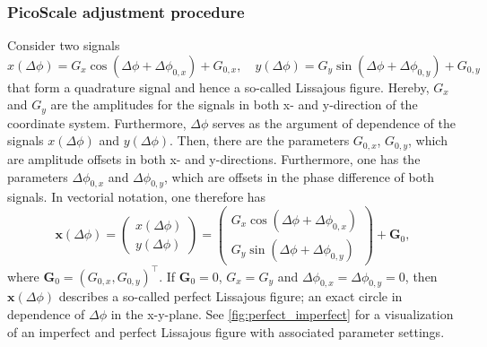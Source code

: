 \documentclass{report}
\numberwithin{tm}{section}
\begin{document}
\subsubsection{PicoScale adjustment procedure}\label{sec:picoscale}
Consider two signals
\begin{equation}
	x(\Delta \phi) = G_x\cos(\Delta \phi + \Delta \phi_{0,x}) + G_{0,x}, \quad y(\Delta \phi) = G_y\sin(\Delta \phi + \Delta \phi_{0,y})  + G_{0,y}
\end{equation}
that form a quadrature signal and hence a so-called Lissajous figure. Hereby, $G_x$ and $G_y$ are the amplitudes for the signals in both x- and y-direction of the coordinate system. Furthermore, $\Delta \phi$ serves as the argument of dependence of the signals $x(\Delta \phi)$ and $y(\Delta \phi)$. Then, there are the parameters $G_{0,x}$, $G_{0,y}$, which are amplitude offsets in both x- and y-directions. Furthermore, one has the parameters $\Delta \phi_{0,x}$ and $\Delta \phi_{0,y}$, which are offsets in the phase difference of both signals. In vectorial notation, one therefore has
\begin{equation}\label{eq:lissajous}
	\boldsymbol{x}(\Delta \phi) = \begin{pmatrix} x(\Delta \phi) \\ y(\Delta \phi) \end{pmatrix} = \begin{pmatrix} G_x \cos(\Delta \phi + \Delta \phi_{0,x}) \\ G_y \sin(\Delta \phi + \Delta \phi_{0,y}) \end{pmatrix} + \boldsymbol{G}_0,
\end{equation}
where $\boldsymbol{G}_0 = (G_{0,x}, G_{0,y})^\top$. If $\boldsymbol{G}_0 = 0$, $G_x = G_y$ and $\Delta \phi_{0,x} = \Delta \phi_{0,y} = 0$, then $\boldsymbol{x}(\Delta \phi)$ describes a so-called perfect Lissajous figure; an exact circle in dependence of $\Delta \phi$ in the x-y-plane. See \cref{fig:perfect_imperfect} for a visualization of an imperfect and perfect Lissajous figure with associated parameter settings.
\end{document}
